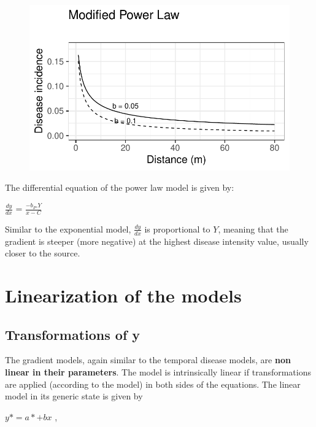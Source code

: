 \documentclass[
  letterpaper,
  DIV=11,
  numbers=noendperiod]{scrreprt}
\begin{document}
\begin{figure}[H]

{\centering \includegraphics{./spatial-models_files/figure-pdf/unnamed-chunk-8-1.pdf}

}

\end{figure}

The differential equation of the power law model is given by:

\(\frac{dy}{dx}\) = \(\frac{-b_{P}.Y}{x - C}\)

Similar to the exponential model, \(\frac{dy}{dx}\) is proportional to
\(Y\), meaning that the gradient is steeper (more negative) at the
highest disease intensity value, usually closer to the source.

\hypertarget{linearization-of-the-models}{%
\section{Linearization of the
models}\label{linearization-of-the-models}}

\hypertarget{transformations-of-y}{%
\subsection{Transformations of y}\label{transformations-of-y}}

The gradient models, again similar to the temporal disease models, are
\textbf{non linear in their parameters}. The model is intrinsically
linear if transformations are applied (according to the model) in both
sides of the equations. The linear model in its generic state is given
by

\(y* = a* + bx\) ,
\end{document}
